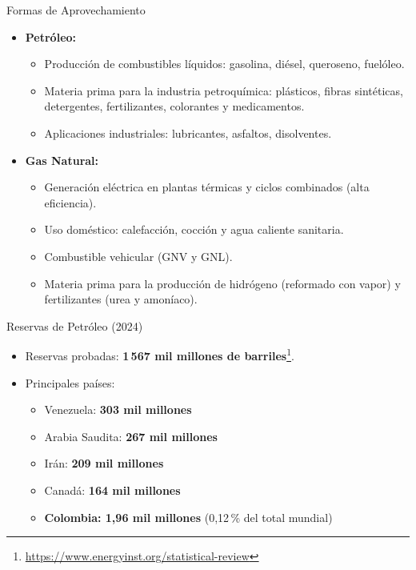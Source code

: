 \documentclass[main.tex]{subfiles}
\begin{document}
\begin{frame}{Formas de Aprovechamiento}
    \begin{itemize}
        \item \textbf{Petróleo:}
        \begin{itemize}
            \item Producción de combustibles líquidos: gasolina, diésel, queroseno, fuelóleo.
            \item Materia prima para la industria petroquímica: plásticos, fibras sintéticas, detergentes, fertilizantes, colorantes y medicamentos.
            \item Aplicaciones industriales: lubricantes, asfaltos, disolventes.
        \end{itemize}
        \item \textbf{Gas Natural:}
        \begin{itemize}
            \item Generación eléctrica en plantas térmicas y ciclos combinados (alta eficiencia).
            \item Uso doméstico: calefacción, cocción y agua caliente sanitaria.
            \item Combustible vehicular (GNV y GNL).
            \item Materia prima para la producción de hidrógeno (reformado con vapor) y fertilizantes (urea y amoníaco).
        \end{itemize}
    \end{itemize}
\end{frame}


\begin{frame}{Reservas de Petróleo (2024)}
    \begin{itemize}
        \item Reservas probadas: \textbf{1\,567 mil millones de barriles}\footnote{\url{https://www.energyinst.org/statistical-review}}.
        \item Principales países:
        \begin{itemize}
            \item Venezuela: \textbf{303 mil millones}
            \item Arabia Saudita: \textbf{267 mil millones}
            \item Irán: \textbf{209 mil millones}
            \item Canadá: \textbf{164 mil millones}
            \item \textbf{Colombia: 1,96 mil millones} (0,12\,\% del total mundial)
        \end{itemize}
    \end{itemize}
\end{frame}
\end{document}
